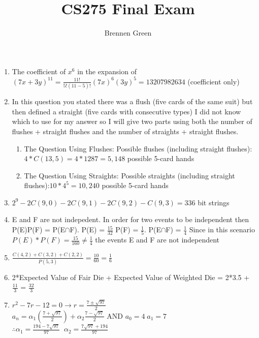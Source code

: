 \documentclass[11pt]{article}
\begin{document}
\title{CS275 Final Exam}
\author{Brennen Green}
\maketitle


\begin{enumerate}
    \item The coefficient of $x^6$ in the expansion of $(7x+3y)^{11} = \frac{11!}{5!(11-5)!}(7x)^6(3y)^5 = 13207982634$ (coefficient only)
    \item In this question you stated there was a flush (five cards of the same suit) but then defined a straight (five cards with consecutive types)
        I did not know which to use for my answer so I will give two parts using both the number of flushes + straight flushes and the number of straights + straight flushes.
        \begin{enumerate}
            \item The Question Using Flushes: \newline
                Possible flushes (including straight flushes):$ 4 * C(13, 5) = 4 * 1287 = 5,148$ possible 5-card hands
            \item The Question Using Straights: \newline
                Possible straights (including straight flushes):$ 10 * 4^5 = 10,240$ possible 5-card hands
        \end{enumerate}
    \item $2^9 - 2C(9,0) - 2C(9,1) - 2C(9,2) - C(9,3) = 336$ bit strings
    \item E and F are not indepedent. In order for two events to be independent then
        P(E)P(F) = P(E$\cap$F). P(E) = $\frac{15}{32}$ P(F) = $\frac{1}{5}$. P(E$\cap$F) = $\frac{1}{4}$
        Since in this scenario $P(E)*P(F) = \frac{15}{160} \neq \frac{1}{4}$ the events E and F are not independent
    \item $\frac{C(4, 2) + C(3, 2) + C(2,2)}{P(5,3)} = \frac{10}{60} = \frac{1}{6}$
    \item 2*Expected Value of Fair Die + Expected Value of Weighted Die = 2*3.5 + $\frac{11}{3}$ = $\frac{32}{3}$
    \newpage
    \item $r^2 - 7r - 12 = 0 \rightarrow r = \frac{7 \pm \sqrt{97}}{2}$\newline
        $a_n = \alpha_1(\frac{7 + \sqrt{97}}{2}) + \alpha_2 \frac{7 - \sqrt{97}}{2} \text{ AND } a_0 = 4\;a_1 = 7$\newline
        $\therefore \alpha_1 = \frac{194-7\sqrt{97}}{97} \;\; \alpha_2 = \frac{7\sqrt{97} + 194}{97}$ \newline

\end{enumerate}
\end{document}
